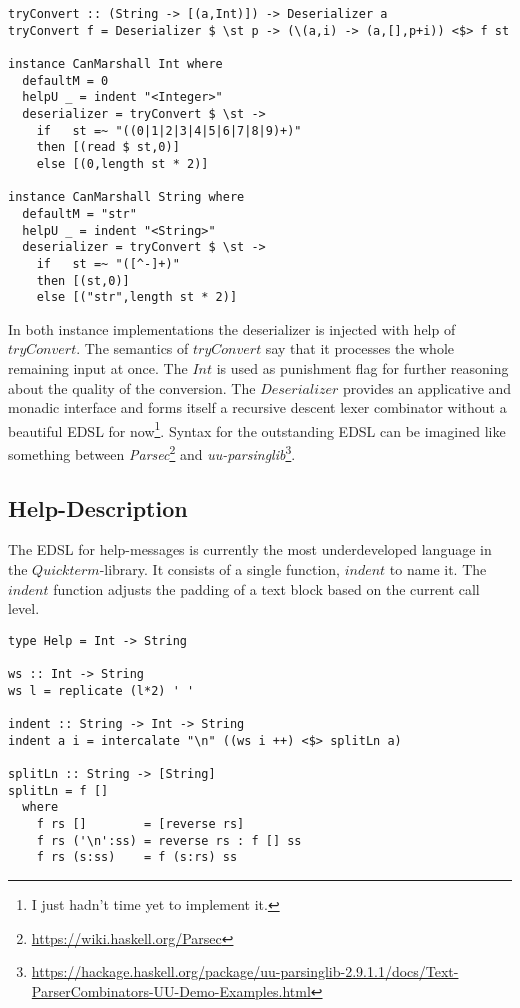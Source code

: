 \documentclass[a4paper]{article}
\begin{document}
\begin{lstlisting}
tryConvert :: (String -> [(a,Int)]) -> Deserializer a
tryConvert f = Deserializer $ \st p -> (\(a,i) -> (a,[],p+i)) <$> f st

instance CanMarshall Int where
  defaultM = 0
  helpU _ = indent "<Integer>"
  deserializer = tryConvert $ \st ->
    if   st =~ "((0|1|2|3|4|5|6|7|8|9)+)"
    then [(read $ st,0)]
    else [(0,length st * 2)]

instance CanMarshall String where
  defaultM = "str"
  helpU _ = indent "<String>"
  deserializer = tryConvert $ \st ->
    if   st =~ "([^-]+)"
    then [(st,0)]
    else [("str",length st * 2)]
\end{lstlisting}

In both instance implementations the deserializer is injected with help of $tryConvert$. The semantics of $tryConvert$ say that it processes the whole remaining input at once. The $Int$ is used as punishment flag for further reasoning about the quality of the conversion. The $Deserializer$ provides an applicative and monadic interface and forms itself a recursive descent lexer combinator without a beautiful EDSL for now\footnote{I just hadn't time yet to implement it.}. Syntax for the outstanding EDSL can be imagined like something between \textit{Parsec}\footnote{\url{https://wiki.haskell.org/Parsec}} and \textit{uu-parsinglib}\footnote{\url{https://hackage.haskell.org/package/uu-parsinglib-2.9.1.1/docs/Text-ParserCombinators-UU-Demo-Examples.html}}.

\subsection{Help-Description}
The EDSL for help-messages is currently the most underdeveloped language in the $Quickterm$-library. It consists of a single function, $indent$ to name it. The $indent$ function adjusts the padding of a text block based on the current call level.

\begin{lstlisting}
type Help = Int -> String

ws :: Int -> String
ws l = replicate (l*2) ' '

indent :: String -> Int -> String
indent a i = intercalate "\n" ((ws i ++) <$> splitLn a)

splitLn :: String -> [String]
splitLn = f []
  where
    f rs []        = [reverse rs]
    f rs ('\n':ss) = reverse rs : f [] ss
    f rs (s:ss)    = f (s:rs) ss

\end{lstlisting}
\end{document}
